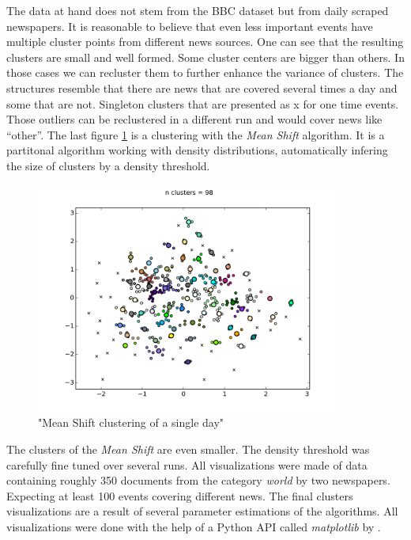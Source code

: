   The data at hand does not stem from the BBC dataset but from daily scraped newspapers. It is reasonable to believe that even less important events have multiple cluster points from different news sources. One can see that the resulting clusters are small and well formed. Some cluster centers are bigger than others. In those cases we can recluster them to further enhance the variance of clusters. The structures resemble that there are news that are covered several times a day and some that are not. Singleton clusters that are presented as x for one time events. Those outliers can be reclustered in a different run and would cover news like ``other''. The last figure \ref{mean_shift_clustering} is a clustering with the \emph{Mean Shift} algorithm. It is a partitonal algorithm working with density distributions, automatically infering the size of clusters by a density threshold.

    \begin{figure}[h!]
      \centering
        \includegraphics[width=0.9\textwidth]{mean_shift_clustering.png}
        \caption{"Mean Shift clustering of a single day"}
        \label{mean_shift_clustering}
    \end{figure} 

  The clusters of the \emph{Mean Shift} are even smaller. The density threshold was carefully fine tuned over several runs. All visualizations were made of data containing roughly 350 documents from the category \emph{world} by two newspapers. Expecting at least 100 events covering different news. The final clusters visualizations are a result of several parameter estimations of the algorithms. All visualizations were done with the help of a Python API called \emph{matplotlib} by \cite{MatPlotHunter2007}.

